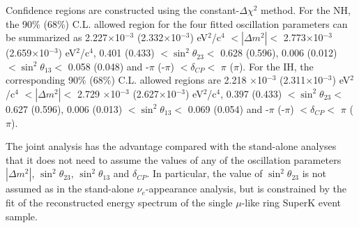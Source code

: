 Confidence regions are constructed using the constant-$\Delta\chi^2$ method.
For the NH, the 90\% (68\%) C.L. allowed region for the four fitted oscillation parameters can be summarized as
2.227$\times$10$^{-3}$ (2.332$\times$10$^{-3}$) eV$^{2}$/c$^{4}$
$< |\Delta m^{2}| < $
2.773$\times$10$^{-3}$ (2.659$\times$10$^{-3}$) eV$^{2}$/c$^{4}$,
0.401 (0.433) $< \sin^{2}\theta_{23} <$ 0.628 (0.596),
0.006 (0.012) $< \sin^{2}\theta_{13} <$ 0.058 (0.048) and
-$\pi$ (-$\pi$) $< \delta_{CP} <$ $\pi$ ($\pi$).
For the IH, the corresponding 90\% (68\%) C.L. allowed regions are
2.218 $\times$10$^{-3}$ (2.311$\times$10$^{-3}$) eV$^{2}$/c$^{4}$
$< |\Delta m^{2}| < $
2.729 $\times$10$^{-3}$ (2.627$\times$10$^{-3}$) eV$^{2}$/c$^{4}$,
0.397 (0.433) $< \sin^{2}\theta_{23} <$ 0.627 (0.596),
0.006 (0.013) $< \sin^{2}\theta_{13} <$ 0.069 (0.054) and
-$\pi$ (-$\pi$) $< \delta_{CP} <$ $\pi$ ($\pi$).

The joint analysis has the advantage compared with the stand-alone analyses that it does not need to assume the values of any of the oscillation 
parameters $|\Delta m^{2}|$, $\sin^{2} \theta_{23}$,  $\sin^{2} \theta_{13}$ and $\delta_{CP}$. In particular, the value of $\sin^{2} \theta_{23}$ 
is not assumed as in the stand-alone $\nu_{e}$-appearance analysis, but is constrained by the fit 
of the reconstructed energy spectrum of the single $\mu$-like ring SuperK event sample.

